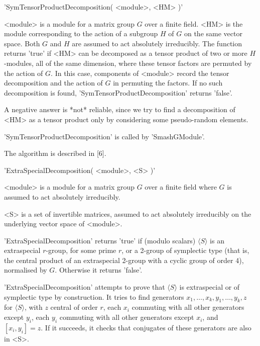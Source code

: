 'SymTensorProductDecomposition( <module>, <HM> )'

<module> is a module for a matrix group $G$ over a finite field.  <HM> is
the module corresponding to  the action of a  subgroup $H$ of $G$ on  the
same vector  space.  Both  $G$ and   $H$  are assumed  to  act absolutely
irreducibly.  The function returns 'true' if <HM>  can be decomposed as a
tensor  product of two  or more $H$-modules,  all of  the same dimension,
where these tensor factors are  permuted by the  action of $G$.  In  this
case, components   of <module> record   the tensor decomposition  and the
action of $G$  in permuting  the  factors.  If  no such decomposition  is
found, 'SymTensorProductDecomposition' returns 'false'.

A  negative answer is *not*  reliable, since we try to find a decomposition   
of <HM> as a tensor product only by considering some pseudo-random elements.

'SymTensorProductDecomposition' is called by 'SmashGModule'.

The algorithm is described in [6].


'ExtraSpecialDecomposition( <module>, <S> )'

<module> is a module for a matrix group $G$ over a finite field where $G$
is assumed to act absolutely irreducibly.

<S>   is a   set  of invertible    matrices, assumed  to   act absolutely
irreducibly on the underlying vector space of <module>.

'ExtraSpecialDecomposition' returns 'true' if (modulo scalars) $\langle S
\rangle$ is an extraspecial $r$-group,  for some prime  $r$, or a 2-group
of  symplectic  type (that  is, the central  product   of an extraspecial
2-group with a cyclic group of order 4), normalised by $G$.  Otherwise it
returns 'false'.

'ExtraSpecialDecomposition' attempts to prove that $\langle S \rangle$ is
 extraspecial  or of symplectic type by   construction.  It tries to find
 generators $x_1, \ldots, x_k, y_1, \ldots, y_k, z$ for $\langle S
\rangle$,  with $z$  central of order $r$, each $x_i$  commuting with all
other  generators  except $y_i$,  each  $y_i$  commuting  with all  other
generators except $x_i$, and $[x_i, y_i] = z$.  If it succeeds, it checks
that conjugates of these generators are also in <S>.

